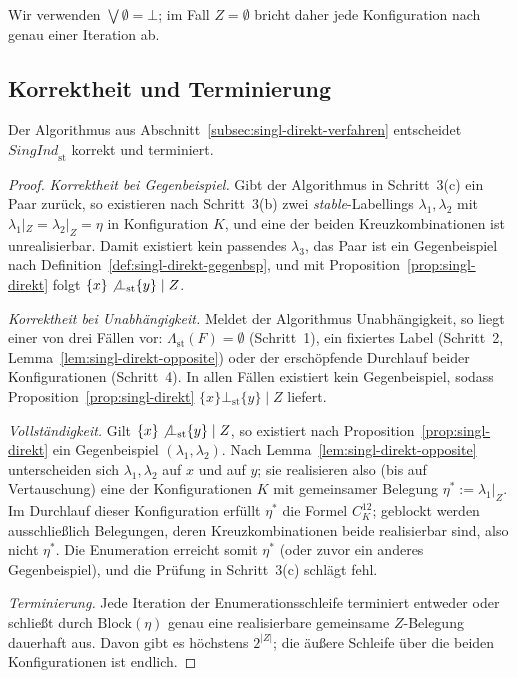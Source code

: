 Wir verwenden \(\bigvee\emptyset=\bot\); im Fall
\(Z=\emptyset\) bricht daher jede Konfiguration nach genau einer Iteration ab.

\subsection{Korrektheit und Terminierung}
\label{subsec:singl-direkt-korrekt}

\begin{Lemma}
    \label{lem:singl-direkt-korrekt}
    Der Algorithmus aus Abschnitt~\ref{subsec:singl-direkt-verfahren}
    entscheidet \(\textit{SingInd}_{\mathrm{st}}\) korrekt und terminiert.
\end{Lemma}

\begin{proof}
    \label{pr:singl-direkt-korrekt}
    \emph{Korrektheit bei Gegenbeispiel.} Gibt der Algorithmus in Schritt~3(c)
    ein Paar zurück, so existieren nach Schritt~3(b) zwei
    \textit{stable}-Labellings \(\lambda_1,\lambda_2\) mit \(\lambda_1|_Z=
    \lambda_2|_Z=\eta\) in Konfiguration \(K\), und eine der beiden
    Kreuzkombinationen ist unrealisierbar. Damit existiert kein passendes
    \(\lambda_3\), das Paar ist ein Gegenbeispiel nach
    Definition~\ref{def:singl-direkt-gegenbsp}, und mit
    Proposition~\ref{prop:singl-direkt} folgt
    \(\{x\}\not\bot_{\mathrm{st}}\{y\}\mid Z\).

    \emph{Korrektheit bei Unabhängigkeit.} Meldet der Algorithmus
    Unabhängigkeit, so liegt einer von drei Fällen vor:
    \(\Lambda_{\mathrm{st}}(F)=\emptyset\) (Schritt~1), ein fixiertes Label
    (Schritt~2, Lemma~\ref{lem:singl-direkt-opposite}) oder der erschöpfende
    Durchlauf beider Konfigurationen (Schritt~4). In allen Fällen existiert
    kein Gegenbeispiel, sodass Proposition~\ref{prop:singl-direkt}
    \(\{x\}\bot_{\mathrm{st}}\{y\}\mid Z\) liefert.

    \emph{Vollständigkeit.} Gilt \(\{x\}\not\bot_{\mathrm{st}}\{y\}\mid Z\), so
    existiert nach Proposition~\ref{prop:singl-direkt} ein Gegenbeispiel
    \((\lambda_1,\lambda_2)\). Nach Lemma~\ref{lem:singl-direkt-opposite}
    unterscheiden sich \(\lambda_1,\lambda_2\) auf \(x\) und auf \(y\); sie
    realisieren also (bis auf Vertauschung) eine der Konfigurationen \(K\) mit
    gemeinsamer Belegung \(\eta^\ast:=\lambda_1|_Z\). Im Durchlauf dieser
    Konfiguration erfüllt \(\eta^\ast\) die Formel \(C^{12}_{K}\); geblockt
    werden ausschließlich Belegungen, deren Kreuzkombinationen beide
    realisierbar sind, also nicht \(\eta^\ast\). Die Enumeration erreicht somit
    \(\eta^\ast\) (oder zuvor ein anderes Gegenbeispiel), und die Prüfung in
    Schritt~3(c) schlägt fehl.

    \emph{Terminierung.} Jede Iteration der Enumerationsschleife terminiert
    entweder oder schließt durch \(\mathrm{Block}(\eta)\) genau eine
    realisierbare gemeinsame \(Z\)-Belegung dauerhaft aus. Davon gibt es
    höchstens \(2^{|Z|}\); die äußere Schleife über die beiden Konfigurationen
    ist endlich.
\end{proof}

